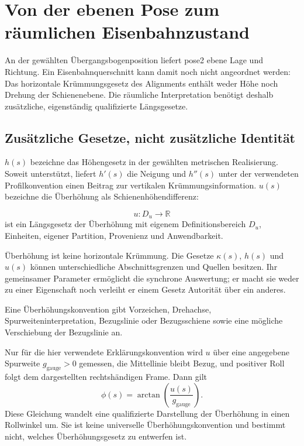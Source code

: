 \chapter{Von der ebenen Pose zum räumlichen Eisenbahnzustand}
\label{chap:pose3-and-cant}

An der gewählten Übergangsbogenposition liefert pose2 ebene Lage und Richtung.
Ein Eisenbahnquerschnitt kann damit noch nicht angeordnet werden: Das
horizontale Krümmungsgesetz des Alignments enthält weder Höhe noch Drehung der
Schienenebene. Die räumliche Interpretation benötigt deshalb zusätzliche,
eigenständig qualifizierte Längsgesetze.

\section{Zusätzliche Gesetze, nicht zusätzliche Identität}

\(h(s)\) bezeichne das Höhengesetz in der gewählten metrischen Realisierung.
Soweit unterstützt, liefert \(h'(s)\) die Neigung und \(h''(s)\) unter der
verwendeten Profilkonvention einen Beitrag zur vertikalen
Krümmungsinformation. \(u(s)\) bezeichne die Überhöhung als
Schienenhöhendifferenz:

\begin{definition}[Überhöhungshöhendifferenz]
\label{def:cant-height-difference}
\[
u\colon D_u\rightarrow \mathbb R
\]
ist ein Längsgesetz der Überhöhung mit eigenem Definitionsbereich \(D_u\),
Einheiten, eigener Partition, Provenienz und Anwendbarkeit.
\end{definition}

Überhöhung ist keine horizontale Krümmung. Die Gesetze \(\kappa(s)\), \(h(s)\)
und \(u(s)\) können unterschiedliche Abschnittsgrenzen und Quellen besitzen.
Ihr gemeinsamer Parameter ermöglicht die synchrone Auswertung; er macht sie
weder zu einer Eigenschaft noch verleiht er einem Gesetz Autorität über ein
anderes.

\begin{definition}[Überhöhungsreferenzkonvention]
\label{def:cant-reference-convention}
Eine Überhöhungskonvention gibt Vorzeichen, Drehachse,
Spurweiteninterpretation, Bezugslinie oder Bezugsschiene sowie eine mögliche
Verschiebung der Bezugslinie an.
\end{definition}

Nur für die hier verwendete Erklärungskonvention wird \(u\) über eine
angegebene Spurweite \(g_{\mathrm{gauge}}>0\) gemessen, die Mittellinie bleibt
Bezug, und positiver Roll folgt dem dargestellten rechtshändigen Frame. Dann
gilt
\begin{equation}
\phi(s)=
\arctan\!\left(\frac{u(s)}{g_{\mathrm{gauge}}}\right).
\label{eq:derived-roll-angle}
\end{equation}
Diese Gleichung wandelt eine qualifizierte Darstellung der Überhöhung in einen
Rollwinkel um. Sie ist keine universelle Überhöhungskonvention und bestimmt
nicht, welches Überhöhungsgesetz zu entwerfen ist.


